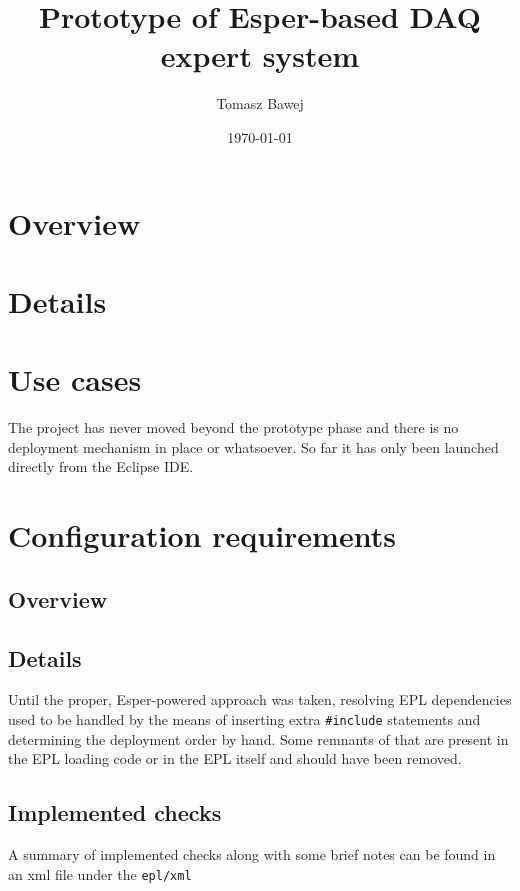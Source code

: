 \documentclass[11pt,oneside,a4paper]{article}
\title{Prototype of Esper-based DAQ expert system}
\date{\today}
\author{Tomasz Bawej}
\begin{document}
\maketitle

\tableofcontents
\clearpage

\section{Overview}

\section{Details}


\section{Use cases}

The project has never moved beyond the prototype phase and there is no deployment mechanism in place or whatsoever.
So far it has only been launched directly from the Eclipse IDE.


\section{Configuration requirements}


\subsection{Overview}
\subsection{Details}

Until the proper, Esper-powered approach was taken, resolving EPL dependencies used to be handled by the means of inserting extra \texttt{\#include} statements and determining the deployment order by hand.
Some remnants of that are present in the EPL loading code or in the EPL itself and should have been removed.

\subsection{Implemented checks}
A summary of implemented checks along with some brief notes can be found in an xml file under the \texttt{epl/xml}

%
\end{document}
